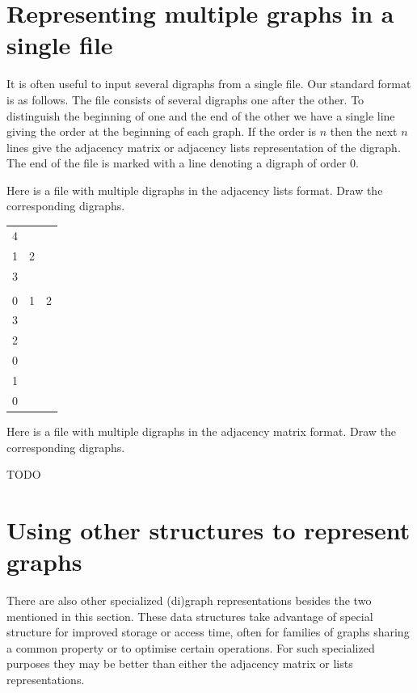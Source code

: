 \section{Representing multiple graphs in a single file}

It is often useful to input several digraphs from a single file. Our
standard format is as follows. The file consists of several digraphs 
one after the other. To distinguish the beginning of one and the end of
the other we have a single line giving the order at the beginning of
each graph. If the order is $n$ then the next $n$ lines give the
adjacency matrix or adjacency lists representation of the digraph. 
The end of the file is marked with a line denoting a digraph of order
$0$.

\begin{Boxample}[3]
Here is a file with multiple digraphs in the adjacency lists format.  Draw the corresponding digraphs.

\begin{tabular}{lll}
4 \\
1 & 2  \\
3 & \\
&  \\
0 & 1 & 2 \\
3 \\
2 \\
0 \\
1 \\
0\\
\end{tabular}
\end{Boxample}


\begin{Boxample}[3]

Here is a file with multiple digraphs in the adjacency matrix format.  Draw the corresponding digraphs.

TODO
\end{Boxample}


\section{Using other structures to represent graphs}

There are also other specialized (di)graph representations besides the
two mentioned in this section.  These data structures take advantage of
special structure for improved storage or access time, often for
families of graphs sharing a common property or to optimise certain operations. For such specialized
purposes they may be better than either the adjacency matrix or lists
representations.

